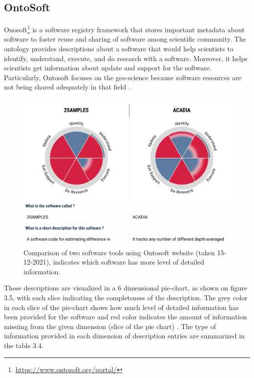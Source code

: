 \subsection{OntoSoft}
\label{subsec:purpose:ontologies:OntoSoft}
Onosoft\footnote{\url{https://www.ontosoft.org/portal/}} is a software registry framework that stores important metadata about software to foster reuse and sharing of software among scientific community. The ontology provides descriptions about a software that would help scientists to identify, understand, execute, and do research with a software. Moreover, it helps scientists get information about update and support for the software. Particularly, Ontosoft focuses on the geo-science because software resources are not being shared adequately in that field \citep{gil2015ontosoft}.\\ 


\begin{figure}[htbp]
	\centering
	\includegraphics[width=.65\textwidth]{4.graphics/figures/ch_3/ontosoft}
	\caption{Comparison of two software tools using Ontosoft website (taken 15-12-2021), indicates which software has more level of detailed information.}
	\label{fig:chapter03:setup}
\end{figure}

These descriptions are visualized in a 6 dimensional pie-chart, as shown on figure 3.5, with each slice indicating the completeness of the description.  The grey color in each slice of the pie-chart shows how much level of detailed information has been provided for the software and red color indicates the amount of information missiing from the given dimension (slice of the pie chart) . The type of information provided in each dimension of description entries are  summarized in the table 3.4.   \\

